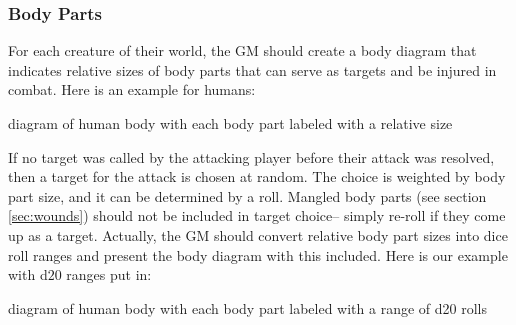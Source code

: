 \documentclass[12pt]{article}
\newcommand{\notes}[1]{{\color{Tan} #1}}
\begin{document}
\subsubsection{Body Parts}\label{sec:bodyparts}

For each creature of their world, the GM should create a body diagram
that indicates relative sizes of body
parts that can serve as targets and be injured in combat.
Here is an example for humans:

\notes{diagram of human body with each body part labeled with a relative size}

If no target was called by the attacking player before their attack was resolved, then a target
for the attack is chosen at random. The choice is weighted by body part size,
and it can be determined by a roll.
Mangled body parts (see section \ref{sec:wounds}) should not be included in target choice--
simply re-roll if they come up as a target.
Actually, the GM should convert relative body part sizes into dice roll ranges
and present the body diagram with this included.
Here is our example with d$20$ ranges put in:

\notes{diagram of human body with each body part labeled with a range of d20 rolls}
\end{document}
